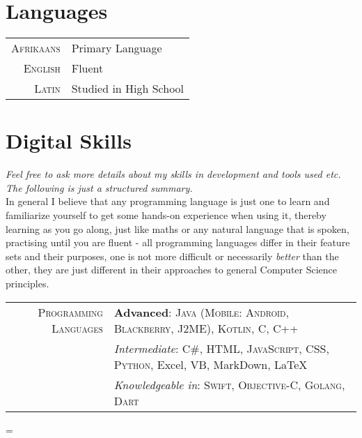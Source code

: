 \documentclass[a4paper,10pt,notitlepage]{article}
\newenvironment{absolutelynopagebreak}
  {\par\nobreak\vfil\penalty0\vfilneg
   \vtop\bgroup}
  {\par\xdef\tpd{\the\prevdepth}\egroup
   \prevdepth=\tpd}
\begin{document}
\begin{absolutelynopagebreak}
	
	\section{Languages}
	\begin{tabular}{r|p{11cm}}
		\textsc{Afrikaans} & Primary Language       \\
		\textsc{English}   & Fluent                 \\
		\textsc{Latin}     & Studied in High School \\
	\end{tabular}
	
	\section{Digital Skills}
	
	\textit{Feel free to ask more details about my skills in development and tools used etc. The following is just a structured summary.} \\
	
	\footnotesize{In general I believe that any programming language is just one to learn and familiarize yourself to get some hands-on experience when using it, thereby learning as you go along, just like maths or any natural language that is spoken, practising until you are fluent - all programming languages differ in their feature sets and their purposes, one is not more difficult or necessarily \textit{better} than the other, they are just different in their approaches to general Computer Science principles.} \\
	
	\begin{tabular}{r|p{11cm}}
		
		\textsc{Programming Languages}    & \textbf{Advanced}: \textsc{Java (Mobile: Android, Blackberry, J2ME)}, \textsc{Kotlin}, \textsc{C}, \textsc{C++} \\
		                                  & \emph{Intermediate}: \textsc{C\#}, \textsc{HTML},  \textsc{JavaScript}, \textsc{CSS}, \textsc{Python}, Excel, VB, MarkDown, {\fb \LaTeX} \setmainfont[SmallCapsFont=Fontin-SmallCaps.otf]{Fontin.otf} \\
		                                  & \emph{Knowledgeable in}: \textsc{Swift}, \textsc{Objective-C}, \textsc{Golang}, \textsc{Dart}\\
		                                  

\end{tabular}
\end{absolutelynopagebreak}
\end{document}

